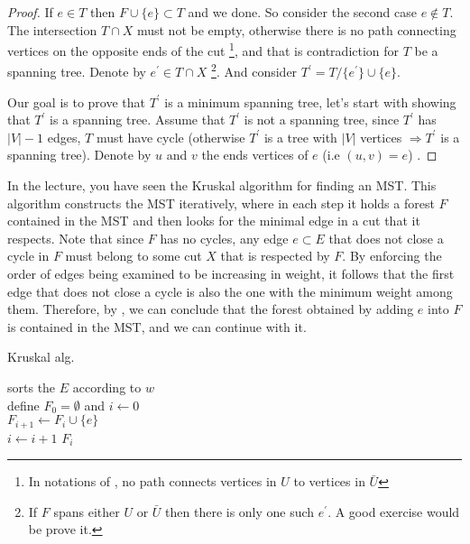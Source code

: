\begin{proof}
  If $e \in T$ then $F \cup \{ e \} \subset T$ and we done. So consider the second case $ e \notin{T} $. The intersection $T\cap X$ must not be empty, otherwise there is no path connecting vertices on the opposite ends of the cut \footnote{In notations of , no path connects vertices in $U$ to vertices in $\bar{U}$}, and that is contradiction for $T$ be a spanning tree. Denote by $e^{\prime} \in T \cap X$ \footnote{If $F$ spans either $U$ or $\bar{U}$ then there is only one such $e^{\prime}$. A good exercise would be prove it. }. And consider $T^{\prime} = T / \{e^{\prime}\} \cup \{e\}$.

  Our goal is to prove that $T^{\prime}$ is a minimum spanning tree, let's start with showing that $T^{\prime}$ is a spanning tree. Assume that $T^{\prime}$ is not a spanning tree, since $T^{\prime}$ has $|V|-1$ edges, $T$ must have cycle (otherwise $T^{\prime}$ is a tree with $|V|$ vertices $\Rightarrow T^{\prime}$ is a spanning tree). Denote by $u$ and $v$ the ends vertices of $e$ (i.e $(u,v) = e$) .   
\end{proof}


In the lecture, you have seen the Kruskal algorithm for finding an MST. This algorithm constructs the MST iteratively, where in each step it holds a forest $F$ contained in the MST and then looks for the minimal edge in a cut that it respects. Note that since $F$ has no cycles, any edge $e \subset E$ that does not close a cycle in $F$ must belong to some cut $X$ that is respected by $F$. By enforcing the order of edges being examined to be increasing in weight, it follows that the first edge that does not close a cycle is also the one with the minimum weight among them. Therefore, by , we can conclude that the forest obtained by adding $e$ into $F$ is contained in the MST, and we can continue with it.

\begin{algorithm}
\SetAlgoLined
{}
\caption{ Kruskal alg.}
sorts the $E$ according to $w$ \\
define $F_{0} = \emptyset$ and $i \leftarrow 0$ \\
 {
   {
    $F_{i+1} \leftarrow F_{i} \cup \{e\}$ \\
    $i \leftarrow i + 1$
  }
}
\Return $F_{i}$
\end{algorithm}



